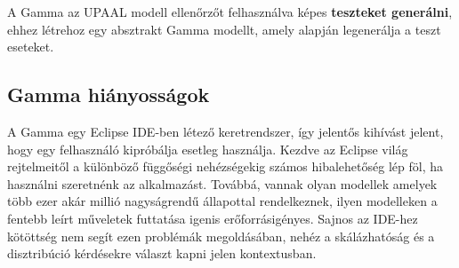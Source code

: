 A Gamma az UPAAL modell ellenőrzőt felhasználva képes \textbf{teszteket generálni}, ehhez létrehoz egy absztrakt Gamma modellt, amely alapján legenerálja a teszt eseteket.

\subsection{Gamma hiányosságok} \label{gamma_missing}

A Gamma egy Eclipse IDE-ben létező keretrendszer, így jelentős kihívást jelent, hogy egy felhasználó kipróbálja esetleg használja. Kezdve az Eclipse világ rejtelmeitől a különböző függőségi nehézségekig számos hibalehetőség lép föl, ha használni szeretnénk az alkalmazást. Továbbá, vannak olyan modellek amelyek több ezer akár millió nagyságrendű állapottal rendelkeznek, ilyen modelleken a fentebb leírt műveletek futtatása igenis erőforrásigényes. Sajnos az IDE-hez kötöttség nem segít ezen problémák megoldásában, nehéz a skálázhatóság és a disztribúció kérdésekre választ kapni jelen kontextusban.














